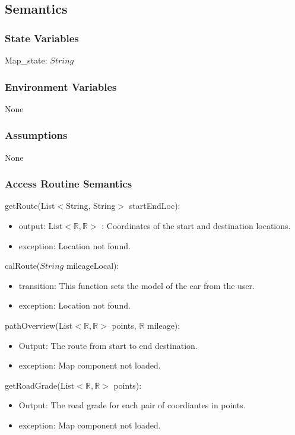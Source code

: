 \documentclass[12pt, titlepage]{article}
\begin{document}
\subsection{Semantics}

\subsubsection{State Variables}

Map\_state: $String$

\subsubsection{Environment Variables}

None

\subsubsection{Assumptions}

None

\subsubsection{Access Routine Semantics}

\noindent getRoute(List$<$String, String$>$ startEndLoc):
\begin{itemize}
\item output: List$<\mathbb{R},\mathbb{R}>$ : Coordinates of the start and destination locations.
\item exception: Location not found.
\end{itemize}

\noindent calRoute($String$ mileageLocal):
\begin{itemize}
\item transition: This function sets the model of the car from the user.
\item exception: Location not found.
\end{itemize}

\noindent pathOverview(List$<\mathbb{R},\mathbb{R}>$ points, $\mathbb{R}$ mileage):
\begin{itemize}
\item Output: The route from start to end destination.
\item exception: Map component not loaded.
\end{itemize}

\noindent getRoadGrade(List$<\mathbb{R},\mathbb{R}>$ points):
\begin{itemize}
\item Output: The road grade for each pair of coordiantes in points.
\item exception: Map component not loaded.
\end{itemize}
\end{document}
